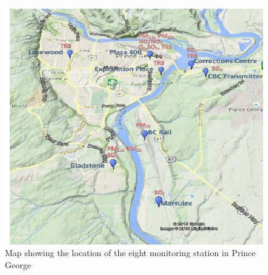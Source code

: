  \begin{figure}[h!]
  \begin{center}
  \includegraphics[scale=0.59]{./images/figure19.png}
  \end{center}
 
  \caption{Map showing the location of the eight monitoring station in Prince George \cite{Environment2016}}
  
  \label{Map}
  \end{figure}
 
  \vspace{5mm}
  




